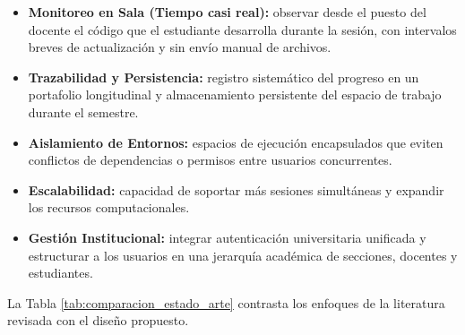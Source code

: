 \begin{itemize}
    \item \textbf{Monitoreo en Sala (Tiempo casi real):} observar desde el puesto del docente el código que el estudiante desarrolla durante la sesión, con intervalos breves de actualización y sin envío manual de archivos.
    \item \textbf{Trazabilidad y Persistencia:} registro sistemático del progreso en un portafolio longitudinal y almacenamiento persistente del espacio de trabajo durante el semestre.
    \item \textbf{Aislamiento de Entornos:} espacios de ejecución encapsulados que eviten conflictos de dependencias o permisos entre usuarios concurrentes.
    \item \textbf{Escalabilidad:} capacidad de soportar más sesiones simultáneas y expandir los recursos computacionales.
    \item \textbf{Gestión Institucional:} integrar autenticación universitaria unificada y estructurar a los usuarios en una jerarquía académica de secciones, docentes y estudiantes.
\end{itemize}

La Tabla \ref{tab:comparacion_estado_arte} contrasta los enfoques de la literatura revisada con el diseño propuesto.

\begin{table}[htbp]
\centering
\caption{Análisis comparativo de soluciones para entornos de programación educativos.}
\label{tab:comparacion_estado_arte}
\end{table}

